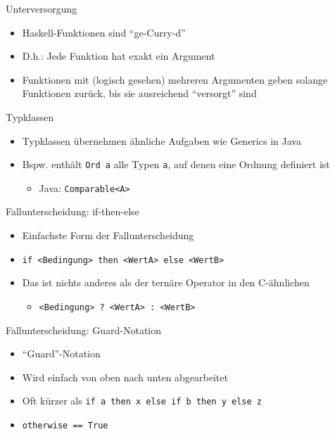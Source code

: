 \documentclass{beamer}
\newcommand{\code}[1]{
	\begin{mdframed}
		
	\end{mdframed}
}
\begin{document}
\begin{frame}{Unterversorgung}
	\begin{itemize}
		\item Haskell-Funktionen sind \enquote{ge-Curry-d}
		\item D.h.: Jede Funktion hat exakt ein Argument
		\item Funktionen mit (logisch gesehen) mehreren Argumenten geben solange Funktionen zurück, bis sie ausreichend \enquote{versorgt} sind
	\end{itemize}
\end{frame}

\begin{frame}{Typklassen}
	\code{code/ghci-typeclass.output}

	\begin{itemize}
		\item Typklassen übernehmen ähnliche Aufgaben wie Generics in Java
		\item Bspw. enthält \texttt{Ord a} alle Typen \texttt{a}, auf denen eine Ordnung definiert ist
		\begin{itemize}
			\item Java: \pause \texttt{Comparable<A>}
		\end{itemize}
	\end{itemize}
\end{frame}

\begin{frame}{Fallunterscheidung: if-then-else}
	\code{demos/MaxIf.hs}

	\begin{itemize}
		\item Einfachste Form der Fallunterscheidung
		\item \texttt{if <Bedingung> then <WertA> else <WertB>}
		\pause
		\item Das ist nichts anderes als der ternäre Operator in den C-ähnlichen
		\begin{itemize}
			\item \texttt{<Bedingung> ? <WertA> : <WertB>}
		\end{itemize}
	\end{itemize}
\end{frame}

\begin{frame}{Fallunterscheidung: Guard-Notation}
	\code{demos/MaxGuard.hs}

	\begin{itemize}
		\item \enquote{Guard}-Notation
		\item Wird einfach von oben nach unten abgearbeitet
		\item Oft kürzer als \texttt{if a then x else if b then y else z}
		\pause
		\item \texttt{otherwise == True}
	\end{itemize}
\end{frame}
\end{document}
